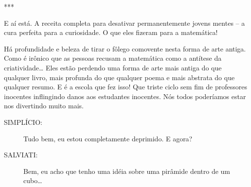 \documentclass[a4paper,oneside,10pt,notitlepage]{article}
\begin{document}
\vspace{1em}

\begin{center}
***
\end{center}

\vspace{1em}

E aí está.
A receita completa para desativar permanentemente jovens mentes -- a cura perfeita para a curiosidade.
O que eles fizeram para a matemática!

Há profundidade e beleza de tirar o fôlego comovente nesta forma de arte antiga.
Como é irônico que as pessoas recusam a matemática como a antítese da criatividade\ldots
Eles estão perdendo uma forma de arte mais antiga do que qualquer livro, mais profunda do que qualquer poema e mais abstrata do que qualquer resumo.
E é a escola que fez isso!
Que triste ciclo sem fim de professores inocentes inflingindo danos aos estudantes inocentes.
Nós todos poderíamos estar nos divertindo muito mais.

\begin{description}
\item[SIMPLÍCIO:] Tudo bem, eu estou completamente deprimido. E agora?
\item[SALVIATI:] Bem, eu acho que tenho uma idéia sobre uma pirâmide dentro de um cubo\ldots
\end{description}
\end{document}
